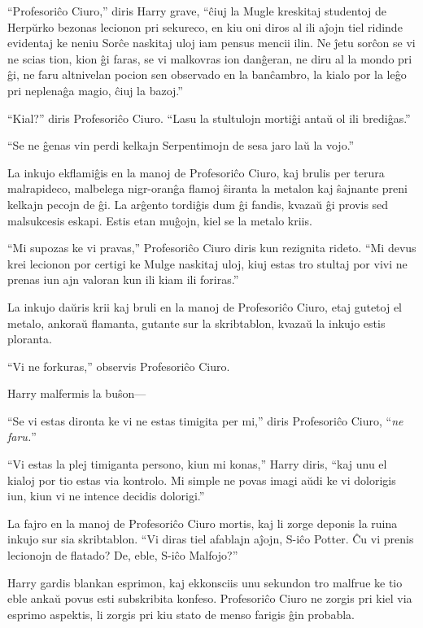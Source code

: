 ``Profesoriĉo Ciuro,'' diris Harry grave,  ``ĉiuj la Mugle kreskitaj
studentoj de Herpŭrko bezonas lecionon pri sekureco, en kiu oni diros
al ili aĵojn tiel ridinde evidentaj ke neniu Sorĉe naskitaj uloj iam
pensus mencii ilin. Ne ĵetu sorĉon se vi ne scias tion, kion ĝi faras,
se vi malkovras ion danĝeran, ne diru al la mondo pri ĝi, ne faru
altnivelan pocion sen observado en la banĉambro, la kialo por la leĝo
pri neplenaĝa magio, ĉiuj la bazoj.''

``Kial?'' diris Profesoriĉo Ciuro. ``Lasu la stultulojn mortiĝi antaŭ
ol ili brediĝas.''

``Se ne ĝenas vin perdi kelkajn Serpentimojn de sesa jaro laŭ la vojo.''

La inkujo ekflamiĝis en la manoj de Profesoriĉo Ciuro, kaj brulis per
terura malrapideco, malbelega nigr-oranĝa flamoj ŝiranta la metalon
kaj ŝajnante preni kelkajn pecojn de ĝi. La arĝento tordiĝis dum ĝi
fandis, kvazaŭ ĝi provis sed malsukcesis eskapi. Estis etan muĝojn,
kiel se la metalo kriis.

``Mi supozas ke vi pravas,'' Profesoriĉo Ciuro diris kun rezignita
rideto. ``Mi devus krei lecionon por certigi ke Mulge naskitaj uloj,
kiuj estas tro stultaj por vivi ne prenas iun ajn valoran kun ili kiam
ili foriras.''

La inkujo daŭris krii kaj bruli en la manoj de Profesoriĉo Ciuro, etaj
gutetoj el metalo, ankoraŭ flamanta, gutante sur la skribtablon,
kvazaŭ la inkujo estis ploranta.

``Vi ne forkuras,'' observis Profesoriĉo Ciuro.

Harry malfermis la buŝon— 

``Se vi estas dironta ke vi ne estas timigita per mi,'' diris Profesoriĉo Ciuro, ``\emph{ne faru.}''

``Vi estas la plej timiganta persono, kiun mi konas,'' Harry diris,
``kaj unu el kialoj por tio estas via kontrolo. Mi simple ne povas
imagi aŭdi ke vi dolorigis iun, kiun vi ne intence decidis dolorigi.''

La fajro en la manoj de Profesoriĉo Ciuro mortis, kaj li zorge deponis
la ruina inkujo sur sia skribtablon. ``Vi diras tiel afablajn aĵojn,
S-iĉo Potter. Ĉu vi prenis lecionojn de flatado? De, eble, S-iĉo
Malfojo?''

Harry gardis blankan esprimon, kaj ekkonsciis unu sekundon tro malfrue
ke tio eble ankaŭ povus esti subskribita konfeso. Profesoriĉo Ciuro ne
zorgis pri kiel via esprimo aspektis, li zorgis pri kiu stato de menso
farigis ĝin probabla.

